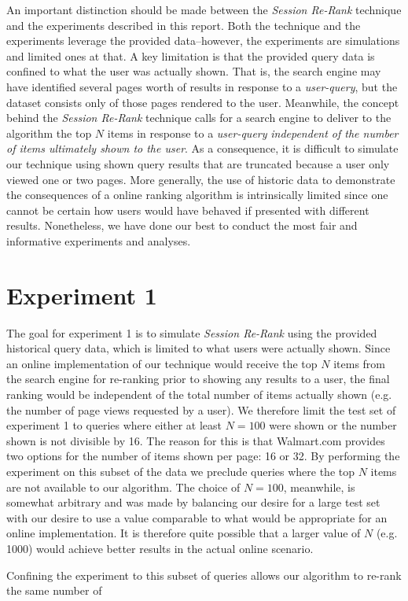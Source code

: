 \documentclass{article}
\begin{document}
An important distinction should be made between the {\em Session Re-Rank}
technique and the experiments described in this report. Both the technique and
the experiments leverage the provided data--however, the experiments are
simulations and limited ones at that. A key limitation is that the provided
query data is confined to what the user was actually shown. That is, the search
engine may have identified several pages worth of results in response to a {\em
user-query}, but the dataset consists only of those pages rendered to the user.
Meanwhile, the concept behind the {\em Session Re-Rank} technique calls for a
search engine to deliver to the algorithm the top $N$ items in response to a
{\em user-query} {\em independent of the number of items ultimately shown to the
user}. As a consequence, it is difficult to simulate our technique using shown
query results that are truncated because a user only viewed one or two pages. 
More generally, the use of historic data to demonstrate the consequences of a 
online ranking algorithm is intrinsically limited since one cannot be certain 
how users would have behaved if presented with different results. Nonetheless, 
we have done our best to conduct the most fair and informative experiments and 
analyses.

\section{Experiment 1}

The goal for experiment 1 is to simulate {\em Session Re-Rank} using the provided historical query data, which is limited to what users were actually shown. Since an online implementation of our technique would receive the top $N$ items from the search engine for re-ranking prior to showing any results to a user, the final ranking would be independent of the total number of items actually shown (e.g. the number of page views requested by a user). We therefore limit the test set of experiment 1 to queries where either at least $N=100$ were shown or the number shown is not divisible by 16. The reason for this is that Walmart.com provides two options for the number of items shown per page: 16 or 32. By performing the experiment on this subset of the data we preclude queries where the top $N$ items are not available to our algorithm. The choice of $N=100$, meanwhile, is somewhat arbitrary and was made by balancing our desire for a large test set with our desire to use a value comparable to what would be appropriate for an online implementation. It is therefore quite possible that a larger value of $N$ (e.g. 1000) would achieve better results in the actual online scenario.


Confining the experiment to this subset of queries allows our algorithm to re-rank the same number of 
\end{document}
